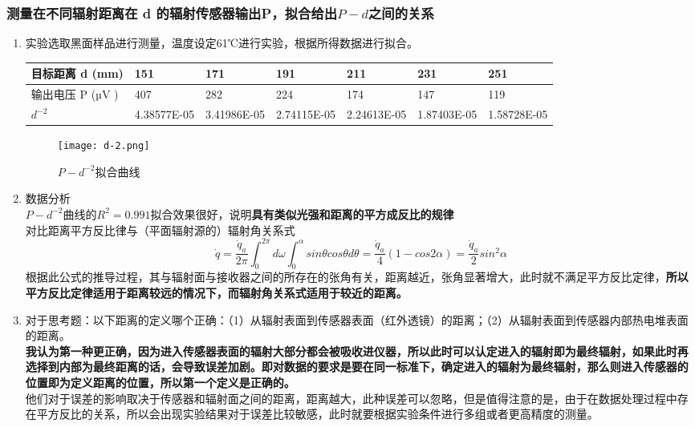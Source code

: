 \documentclass[dvipsnames, svgnames,a4paper,11pt]{article}
\begin{document}
	\subsubsection{测量在不同辐射距离在 d 的辐射传感器输出P，拟合给出$P-d$之间的关系}
	\begin{enumerate}
		\item 实验选取黑面样品进行测量，温度设定61℃进行实验，根据所得数据进行拟合。
		\begin{table}[!ht]
			\centering
			\begin{tabular}{|l|l|l|l|l|l|l|}
			\hline
				目标距离 d (mm) & 151 & 171 & 191 & 211 & 231 & 251  \\ \hline
				输出电压 P (µV )  & 407 & 282 & 224 & 174 & 147 & 119  \\ \hline
				$d^{-2}$& 4.38577E-05 & 3.41986E-05 & 2.74115E-05 & 2.24613E-05 & 1.87403E-05 & 1.58728E-05  \\ \hline
				
			\end{tabular}
		\end{table}
	
	
	\begin{figure}[{H}]
		\centering
		\texttt{[image: d-2.png]}
		\caption{$P-d^{-2}$拟合曲线}
		\label{}
	\end{figure}
	\item 数据分析\\
	$P-d^{-2}$曲线的$R^{2}=0.991$拟合效果很好，说明\textbf{具有类似光强和距离的平方成反比的规律}\\
	对比距离平方反比律与（平面辐射源的）辐射角关系式$$\dot{q}=\frac{\dot{q}_a}{2\pi}\int_0^{2\pi}d\omega\int_0^\alpha sin\theta cos\theta d\theta=\frac{\dot{q}_a}4(1-cos2\alpha)=\frac{\dot{q}_a}2sin^2\alpha $$
	根据此公式的推导过程，其与辐射面与接收器之间的所存在的张角有关，距离越近，张角显著增大，此时就不满足平方反比定律，\textbf{所以平方反比定律适用于距离较远的情况下，而辐射角关系式适用于较近的距离。}
	\item 对于思考题：以下距离的定义哪个正确：（1）从辐射表面到传感器表面（红外透镜）的距离；（2）从辐射表面到传感器内部热电堆表面的距离。\\
	\textbf{我认为第一种更正确，因为进入传感器表面的辐射大部分都会被吸收进仪器，所以此时可以认定进入的辐射即为最终辐射，如果此时再选择到内部为最终距离的话，会导致误差加剧。即对数据的要求是要在同一标准下，确定进入的辐射为最终辐射，那么则进入传感器的位置即为定义距离的位置，所以第一个定义是正确的。}\\
	他们对于误差的影响取决于传感器和辐射面之间的距离，距离越大，此种误差可以忽略，但是值得注意的是，由于在数据处理过程中存在平方反比的关系，所以会出现实验结果对于误差比较敏感，此时就要根据实验条件进行多组或者更高精度的测量。
	
	\end{enumerate}
\end{document}
